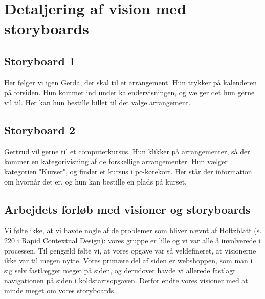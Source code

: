 \section{Detaljering af vision med storyboards}

\subsection{Storyboard 1}
Her følger vi igen Gerda, der skal til et arrangement. Hun trykker på kalenderen på forsiden. 
Hun kommer ind under kalendervisningen, og vælger det hun gerne vil til. Her kan hun bestille billet til det valge arrangement.


\subsection{Storyboard 2}
Gertrud vil gerne til et computerkursus. Hun klikker på arrangementer, så der kommer en kategorivisning af de forskellige arrangementer.
Hun vælger kategorien "Kurser", og finder et kursus i pc-kørekort. Her står der information om hvornår det er, og hun kan bestille en plads på
kurset.

\subsection{Arbejdets forløb med visioner og storyboards}
Vi følte ikke, at vi havde nogle af de problemer som bliver nævnt af Holtzblatt (s. 220 i Rapid Contextual Design):
vores gruppe er lille og vi var alle 3 involverede i processen. Til gengæld følte vi, at vores opgave var så veldefineret,
at visionerne ikke var til megen nytte. Vores primære del af siden er webshoppen, som man i sig selv fastlægger meget på siden,
og derudover havde vi allerede fastlagt navigationen på siden i koldstartsopgaven. Derfor endte vores visioner med at minde meget
om vores storyboards. 

